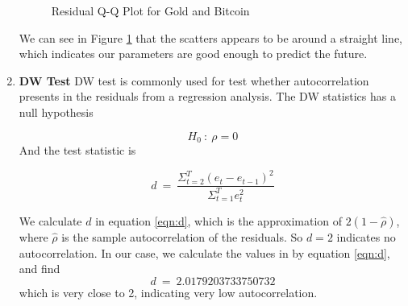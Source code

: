 \documentclass[12pt,a4paper]{article}
\begin{document}
\begin{spacing}{1.2}
\begin{enumerate}
	\begin{figure}
		\begin{center}
		\end{center}
			\caption{Residual Q-Q Plot for Gold and Bitcoin}
		\label{fig:qq_plot}
	\end{figure}

	We can see in Figure \ref{fig:qq_plot} that the scatters appears to be around a straight line, which indicates our parameters are good enough to predict the future.
	
	\item \textbf{DW Test}
	DW test is commonly used for test whether autocorrelation presents in the residuals from a regression analysis. The DW statistics has a null hypothesis
	
$$
	H_0 \ : \ \rho = 0	
$$
	And the test statistic is
	
	\begin{equation}\label{eqn:d}
		d \ = \ \frac{\Sigma_{t=2}^T(e_t-e_{t-1})^2}{\Sigma_{t=1}^T e_t^2}
	\end{equation}

	We calculate $d$ in equation \ref{eqn:d}, which is the approximation of $2(1-\hat{\rho})$, where $\hat{\rho}$ is the sample autocorrelation of the residuals. So $d=2$ indicates no autocorrelation. In our case, we calculate the values in by equation \ref{eqn:d}, and find
	$$
	d \ = \ 2.0179203733750732
	$$
	which is very close to 2, indicating very low autocorrelation. 
\end{enumerate}



\end{spacing}
\end{document}
